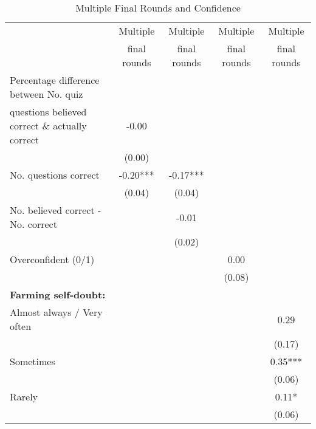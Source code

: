 \begin{table}[htbp]
\centering
\hspace*{-1.2cm}
\begin{threeparttable}
\small
\caption{Multiple Final Rounds and Confidence}
\label{tab:B2a_any}
\begin{tabular}{l cccc}
\hline
\hline
& Multiple & Multiple & Multiple & Multiple \\
& final rounds & final rounds & final rounds & final rounds \\ \hline
Percentage difference between No. quiz&               &               &               &               \\
questions believed correct \& actually correct&       -0.00   &               &               &               \\
                    &      (0.00)   &               &               &               \\
No. questions correct&       -0.20***&       -0.17***&               &               \\
                    &      (0.04)   &      (0.04)   &               &               \\
No. believed correct - No. correct&               &       -0.01   &               &               \\
                    &               &      (0.02)   &               &               \\
Overconfident (0/1) &               &               &        0.00   &               \\
                    &               &               &      (0.08)   &               \\
\textbf{Farming self-doubt:}&               &               &               &               \\
Almost always / Very often&               &               &               &        0.29   \\
                    &               &               &               &      (0.17)   \\
Sometimes           &               &               &               &        0.35***\\
                    &               &               &               &      (0.06)   \\
Rarely              &               &               &               &        0.11*  \\
                    &               &               &               &      (0.06)   \\

\end{tabular}
\end{threeparttable}
\end{table}
